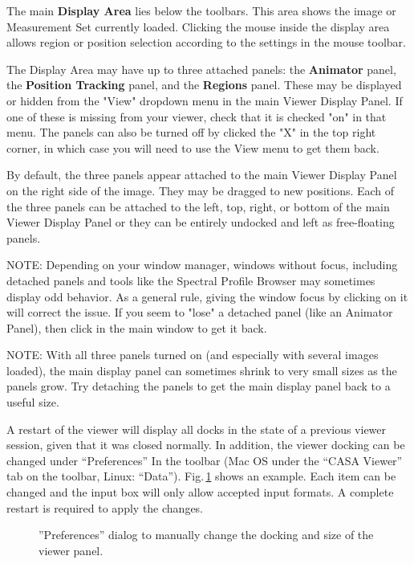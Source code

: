 The main {\bf Display Area} lies below the toolbars. This area shows
the image or Measurement Set currently loaded. Clicking the mouse inside
the display area allows region or position selection according to the settings
in the mouse toolbar.

The Display Area may have up to three attached panels: the {\bf
  Animator} panel, the {\bf Position Tracking} panel, and the {\bf
  Regions} panel. These may be displayed or hidden from the "View"
  dropdown menu in the main Viewer Display Panel. If one of these is missing
  from your viewer, check that it is checked "on" in that menu. The panels can 
  also be turned off by clicked the "X" in the top right corner, in which case you
  will need to use the View menu to get them back.
 
By default, the three panels appear attached to the main Viewer Display Panel 
on the right side of the image. They may be dragged to new positions. Each of the
three panels can be attached to the left, top, right, or bottom of the main Viewer Display Panel or
they can be entirely undocked and left as free-floating panels.

NOTE: Depending on your window manager, windows without focus, including detached
panels and tools like the Spectral Profile Browser may sometimes display odd behavior. As a general
rule, giving the window focus by clicking on it will correct the issue. If you seem to "lose" a detached
panel (like an Animator Panel), then click in the main window to get it back.

NOTE: With all three panels turned on (and especially with several images loaded), the main display panel can sometimes shrink to
very small sizes as the panels grow. Try detaching the panels to get
the main display panel back to a useful size.

A restart of the viewer will display all docks in the state of a
previous viewer session, given that it was closed normally. In
addition, the viewer docking can be changed under ``Preferences''  In
the toolbar (Mac OS under the ``CASA Viewer'' tab on the toolbar,
Linux: ``Data''). Fig.\,\ref{fig:viewer_preferences} shows an
example. Each item can be changed and the input box will only allow
accepted input formats. A complete restart is required to apply the
changes. 


\begin{figure}[h!]
\begin{center}
\caption{\label{fig:viewer_preferences}''Preferences'' dialog to
  manually change the docking and size of the viewer panel.}
\hrulefill
\end{center}
\end{figure}

